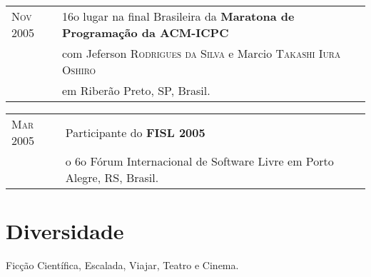 \documentclass[letter,10pt]{article}
\begin{document}
\begin{tabular}{p{2.5cm}l}
  \textsc{Nov 2005} & 16o lugar na final Brasileira da
  \textbf{Maratona de Programação da ACM-ICPC}\\
  & com Jeferson \textsc{Rodrigues da Silva} e Marcio
  \textsc{Takashi Iura Oshiro}\\
  & em Riberão Preto, SP, Brasil.\\
\end{tabular}

\begin{tabular}{p{2.5cm}l}
  \textsc{Mar 2005} & Participante do \textbf{FISL 2005}\\
  & o 6o Fórum Internacional de Software Livre em Porto
  Alegre, RS, Brasil.\\
\end{tabular}

\section{Diversidade}

Ficção Científica, Escalada, Viajar, Teatro e Cinema.
\end{document}
